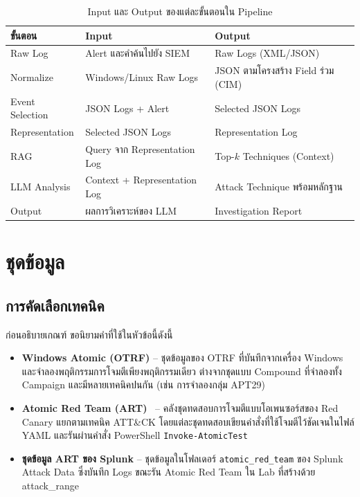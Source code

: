 \begin{table}[ht]
  \centering
  \caption{Input และ Output ของแต่ละขั้นตอนใน Pipeline}
  \label{tab:pipeline-io}
  \begin{tabular}{|l|l|l|}
    \hline
    \textbf{ขั้นตอน} & \textbf{Input} & \textbf{Output} \\ \hline
    Raw Log        & Alert และคำค้นไปยัง SIEM            & Raw Logs (XML/JSON) \\ \hline
    Normalize      & Windows/Linux Raw Logs               & JSON ตามโครงสร้าง Field ร่วม (CIM) \\ \hline
    Event Selection & JSON Logs + Alert                   & Selected JSON Logs \\ \hline
    Representation & Selected JSON Logs                   & Representation Log \\ \hline
    RAG            & Query จาก Representation Log         & Top-$k$ Techniques (Context) \\ \hline
    LLM Analysis   & Context + Representation Log         & Attack Technique พร้อมหลักฐาน \\ \hline
    Output         & ผลการวิเคราะห์ของ LLM                 & Investigation Report \\ \hline
  \end{tabular}
\end{table}

\section{ชุดข้อมูล}
\label{sec:dataset}

\subsection{การคัดเลือกเทคนิค}
ก่อนอธิบายเกณฑ์ ขอนิยามคำที่ใช้ในหัวข้อนี้ดังนี้
\begin{itemize}
  \item \textbf{Windows Atomic (OTRF)} -- ชุดข้อมูลของ OTRF ที่บันทึกจากเครื่อง Windows
        และจำลองพฤติกรรมการโจมตีเพียงพฤติกรรมเดียว ต่างจากชุดแบบ Compound ที่จำลองทั้ง Campaign
        และมีหลายเทคนิคปนกัน (เช่น การจำลองกลุ่ม APT29)
  \item \textbf{Atomic Red Team (ART)}~\cite{atomic-red-team} -- คลังชุดทดสอบการโจมตีแบบโอเพนซอร์สของ Red Canary
        แยกตามเทคนิค ATT\&CK โดยแต่ละชุดทดสอบเขียนคำสั่งที่ใช้โจมตีไว้ชัดเจนในไฟล์ YAML
        และรันผ่านคำสั่ง PowerShell \texttt{Invoke-AtomicTest}
  \item \textbf{ชุดข้อมูล ART ของ Splunk} -- ชุดข้อมูลในโฟลเดอร์ \texttt{atomic\_red\_team} ของ Splunk Attack Data
        ซึ่งบันทึก Logs ขณะรัน Atomic Red Team ใน Lab ที่สร้างด้วย attack\_range
\end{itemize}

